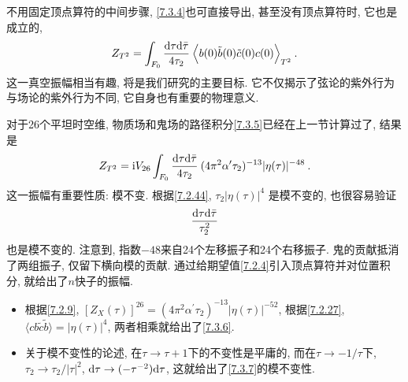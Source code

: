 
不用固定顶点算符的中间步骤, \eqref{7.3.4}也可直接导出, 甚至没有顶点算符时, 它也是成立的, 
\begin{equation}
	Z_{T^{2}}=\int_{F_{0}} \frac{\mathrm{d} \tau \mathrm{d} \bar{\tau}}{4 \tau_{2}} \:
	\Bigl\langle b(0) \tilde{b}(0) \tilde{c}(0) c(0)\Bigr\rangle_{T^{2}} \:. \label{7.3.5}
\end{equation}
这一真空振幅相当有趣, 将是我们研究的主要目标. 它不仅揭示了弦论的紫外行为与场论的紫外行为不同, 它自身也有重要的物理意义.

对于26个平坦时空维, 物质场和鬼场的路径积分\eqref{7.3.5}已经在上一节计算过了, 结果是
\begin{equation}
	Z_{T^{2}}=\mathrm{i} V_{26} \int_{F_{0}} \frac{\mathrm{d} \tau \mathrm{d} \bar{\tau}}{4 \tau_{2}} \: 
	(4 \pi^{2} \alpha^{\prime} \tau_{2})^{-13}|\eta(\tau)|^{-48} \:. \label{7.3.6}
\end{equation}
这一振幅有重要性质: 模不变. 根据\eqref{7.2.44},  $\tau_{2}|\eta(\tau)|^{4}$ 是模不变的, 也很容易验证
\begin{equation}
	\frac{\mathrm{d} \tau \mathrm{d} \bar{\tau}}{\tau_{2}^{2}} \label{7.3.7}
\end{equation}
也是模不变的. 注意到, 指数${-48}$来自24个左移振子和24个右移振子. 鬼的贡献抵消了两组振子, 仅留下横向模的贡献. 
通过给期望值\eqref{7.2.4}引入顶点算符并对位置积分, 就给出了$n$快子的振幅. 

\begin{tcolorbox}
	\begin{itemize}
		\item 
		根据\eqref{7.2.9}, $[Z_{X}(\tau)]^{26}=(4 \pi^{2} \alpha^{\prime} \tau_{2})^{-13}|\eta(\tau)|^{-52}$, 根据\eqref{7.2.27}, 
		$\langle c b \tilde{c} \tilde{b}\rangle=|\eta(\tau)|^{4}$, 两者相乘就给出了\eqref{7.3.6}.
		\item 关于模不变性的论述, 在$\tau\to\tau+1$下的不变性是平庸的, 而在$\tau\to -1/\tau$下, $\tau_{2}\to \tau_{2}/|\tau|^{2}$, 
		$\mathrm{d} \tau \to (-\tau^{-2})\mathrm{d}\tau$, 这就给出了\eqref{7.3.7}的模不变性.
	\end{itemize}
\end{tcolorbox}


